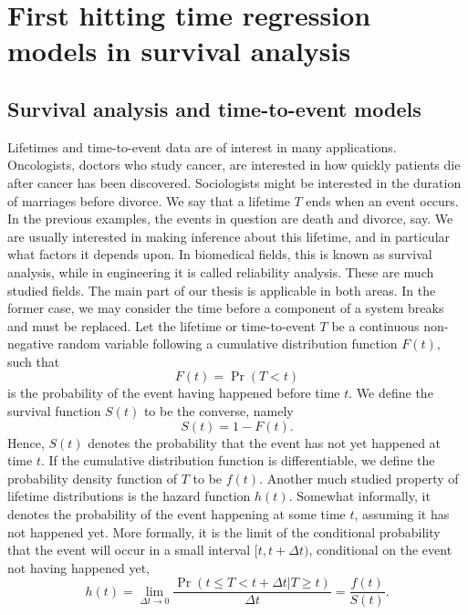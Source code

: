 \chapter{First hitting time regression models in survival analysis}

\section{Survival analysis and time-to-event models}\label{sec:survival}
Lifetimes and time-to-event data are of interest in many applications. Oncologists, doctors who study cancer, are interested in how quickly patients die after cancer has been discovered. Sociologists might be interested in the duration of marriages before divorce. We say that a lifetime $T$ ends when an event occurs. In the previous examples, the events in question are death and divorce, say. We are usually interested in making inference about this lifetime, and in particular what factors it depends upon. In biomedical fields, this is known as survival analysis, while in engineering it is called reliability analysis. These are much studied fields. The main part of our thesis is applicable in both areas. In the former case, we may consider the time before a component of a system breaks and must be replaced. Let the lifetime or time-to-event $T$ be a continuous non-negative random variable following a cumulative distribution function $F(t)$, such that
\begin{equation*}%
    F(t)=\Pr(T<t)
\end{equation*}
is the probability of the event having happened before time $t$. We define the survival function $S(t)$ to be the converse, namely
\begin{equation*}%
    S(t)=1-F(t).
\end{equation*}
Hence, $S(t)$ denotes the probability that the event has not yet happened at time $t$. If the cumulative distribution function is differentiable, we define the probability density function of $T$ to be $f(t)$. Another much studied property of lifetime distributions is the hazard function $h(t)$. Somewhat informally, it denotes the probability of the event happening at some time $t$, assuming it has not happened yet. More formally, it is the limit of the conditional probability that the event will occur in a small interval $[t,t+\Delta t)$, conditional on the event not having happened yet,
\begin{equation*}%
    h(t)=\lim_{\Delta t\to 0}\frac{\Pr(t\leq T<t+\Delta t|T\geq t)}{\Delta t}=\frac{f(t)}{S(t)}.
\end{equation*}
